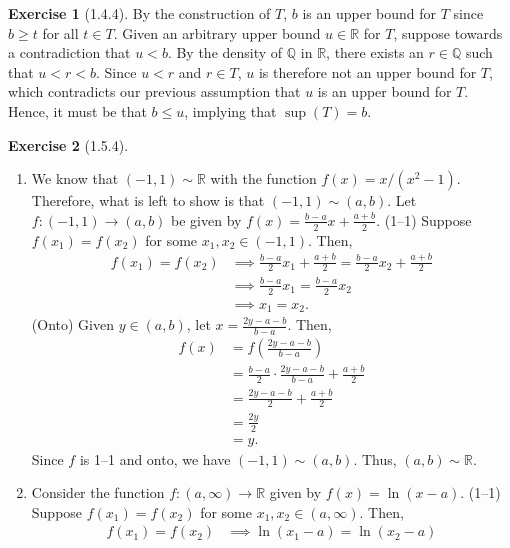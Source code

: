 \documentclass{amsart}
\theoremstyle{definition}
\newtheorem{exercise}{Exercise}
\newcommand{\Q}{\mathbb{Q}}
\newcommand{\R}{\mathbb{R}}
\begin{document}
\begin{exercise}[1.4.4]
  By the construction of $T$, $b$ is an upper bound for $T$ since $b \ge t$ for
  all $t \in T$. Given an arbitrary upper bound $u \in \R$ for $T$, suppose
  towards a contradiction that $u < b$. By the density of $\Q$ in $\R$, there
  exists an $r \in \Q$ such that $u < r < b$. Since $u < r$ and $r \in T$, $u$
  is therefore not an upper bound for $T$, which contradicts our previous
  assumption that $u$ is an upper bound for $T$. Hence, it must be that $b \le
  u$, implying that $\sup(T) = b$.
\end{exercise}

\begin{exercise}[1.5.4]
  \begin{enumerate}[label={(\alph*)}]
    \item We know that $(-1, 1) \sim \R$ with the function $f(x) = x / (x^2 -
      1)$. Therefore, what is left to show is that $(-1, 1) \sim (a, b)$. Let $f
      : (-1, 1) \rightarrow (a, b)$ be given by $f(x) = \frac{b - a}{2} x +
      \frac{a + b}{2}$. (1--1) Suppose $f(x_1) = f(x_2)$ for some $x_1, x_2
      \in (-1, 1)$. Then,
      \begin{align*}
        f(x_1) = f(x_2) &\implies \frac{b - a}{2} x_1 + \frac{a + b}{2} =
        \frac{b - a}{2} x_2 + \frac{a + b}{2} \\
        &\implies \frac{b - a}{2} x_1 = \frac{b - a}{2} x_2 \\
        &\implies x_1 = x_2.
      \end{align*}
      (Onto) Given $y \in (a, b)$, let $x = \frac{2y - a - b}{b - a}$. Then,
      \begin{align*}
        f(x) &= f\left(\frac{2y - a - b}{b - a}\right) \\
        &= \frac{b - a}{2} \cdot \frac{2y - a - b}{b - a} + \frac{a + b}{2} \\
        &= \frac{2y - a - b}{2} + \frac{a + b}{2} \\
        &= \frac{2y}{2} \\
        &= y.
      \end{align*}
      Since $f$ is 1--1 and onto, we have $(-1, 1) \sim (a, b)$. Thus, $(a, b)
      \sim \R$.
    \item Consider the function $f : (a, \infty) \rightarrow \R$ given by $f(x)
      = \ln(x - a)$. (1--1) Suppose $f(x_1) = f(x_2)$ for some $x_1, x_2 \in (a,
      \infty)$. Then,
      \begin{align*}
        f(x_1) = f(x_2) &\implies \ln(x_1 - a) = \ln(x_2 - a) \\

\end{align*}
\end{enumerate}
\end{exercise}
\end{document}
